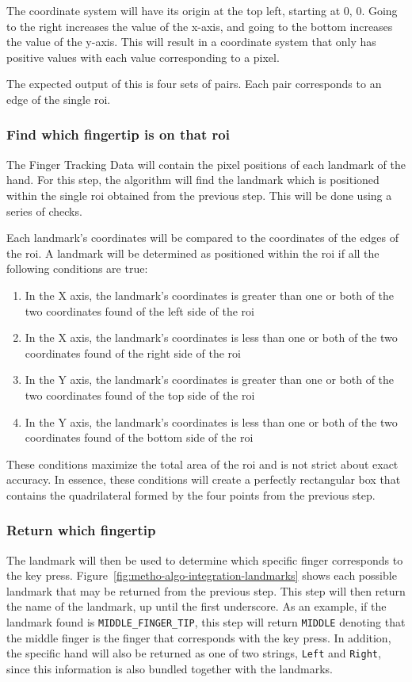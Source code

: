\documentclass{report}
\begin{document}
The coordinate system will have its origin at the top left, starting at 0, 0.
Going to the right increases the value of the x-axis, and going to the bottom
increases the value of the y-axis. This will result in a coordinate system that
only has positive values with each value corresponding to a pixel.

The expected output of this is four sets of pairs. Each pair corresponds to an
edge of the single \ac{roi}.

\subsubsection{Find which fingertip is on that \ac{roi}}
The Finger Tracking Data will contain the pixel positions of each landmark of
the hand. For this step, the algorithm will find the landmark which is
positioned within the single \ac{roi} obtained from the previous step.
This will be done using a series of checks.

Each landmark's coordinates will be compared to the coordinates of the edges of
the \ac{roi}. A landmark will be determined as positioned within the \ac{roi} if all the
following conditions are true:
\begin{enumerate}
	\item In the X axis, the landmark's coordinates is greater than one or both of
	      the two coordinates found of the left side of the \ac{roi}
	\item In the X axis, the landmark's coordinates is less than one or both of
	      the two coordinates found of the right side of the \ac{roi}
	\item In the Y axis, the landmark's coordinates is greater than one or both of
	      the two coordinates found of the top side of the \ac{roi}
	\item In the Y axis, the landmark's coordinates is less than one or both of
	      the two coordinates found of the bottom side of the \ac{roi}
\end{enumerate}

These conditions maximize the total area of the \ac{roi} and is not strict about
exact accuracy. In essence, these conditions will create a perfectly rectangular
box that contains the quadrilateral formed by the four points from the previous
step.

\subsubsection{Return which fingertip}
The landmark will then be used to determine which specific finger corresponds to
the key press. Figure~\ref{fig:metho-algo-integration-landmarks} shows each
possible landmark that may be returned from the previous step. This step will
then return the name of the landmark, up until the first underscore. As an
example, if the landmark found is \texttt{MIDDLE\_FINGER\_TIP}, this step will
return \texttt{MIDDLE} denoting that the middle finger is the finger that
corresponds with the key press. In addition, the specific hand will also be
returned as one of two strings, \texttt{Left} and \texttt{Right}, since
this information is also bundled together with the landmarks.
\end{document}
